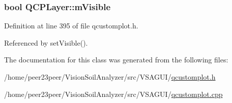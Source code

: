 \subsubsection[{m\+Visible}]{\setlength{\rightskip}{0pt plus 5cm}bool Q\+C\+P\+Layer\+::m\+Visible\hspace{0.3cm}{\ttfamily [protected]}}\label{class_q_c_p_layer_a264950deb08e589460c126c895a1e2b5}


Definition at line 395 of file qcustomplot.\+h.



Referenced by set\+Visible().



The documentation for this class was generated from the following files\+:\begin{DoxyCompactItemize}
\item 
/home/peer23peer/\+Vision\+Soil\+Analyzer/src/\+V\+S\+A\+G\+U\+I/\hyperlink{qcustomplot_8h}{qcustomplot.\+h}\item 
/home/peer23peer/\+Vision\+Soil\+Analyzer/src/\+V\+S\+A\+G\+U\+I/\hyperlink{qcustomplot_8cpp}{qcustomplot.\+cpp}\end{DoxyCompactItemize}
